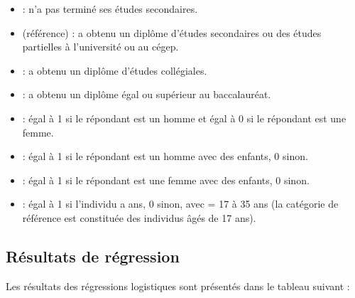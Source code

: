 \documentclass[letterpaper,10pt,french]{sphinxmanual}
\begin{document}
\begin{itemize}
\item {} 
 : n’a pas terminé ses études secondaires.

\item {} 
 (référence) : a obtenu un diplôme d’études secondaires ou des études partielles à l’université ou au cégep.

\item {} 
 : a obtenu un diplôme d’études collégiales.

\item {} 
 : a obtenu un diplôme égal ou supérieur au baccalauréat.

\end{itemize}

\begin{itemize}
\item {} 
 : égal à 1 si le répondant est un homme et égal à 0 si le répondant est une femme.

\item {} 
 : égal à 1 si le répondant est un homme avec des enfants, 0 sinon.

\item {} 
 : égal à 1 si le répondant est une femme avec des enfants, 0 sinon.

\item {} 
 : égal à 1 si l’individu a  ans, 0 sinon, avec  = 17 à 35 ans (la catégorie de référence est constituée des individus âgés de 17 ans).

\end{itemize}


\subsection{Résultats de régression}
\label{\detokenize{methodologie:id5}}
Les résultats des régressions logistiques sont présentés dans le tableau suivant :
\end{document}

